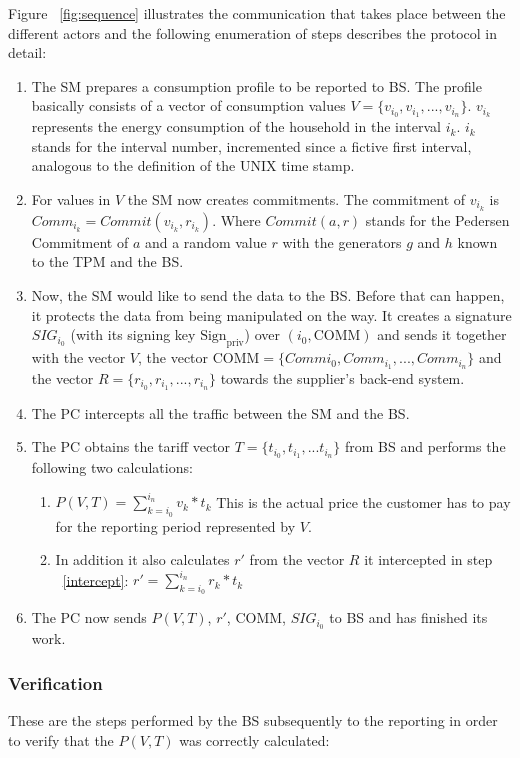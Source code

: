 \documentclass[english]{llncs}
\begin{document}
Figure ~\ref{fig:sequence} illustrates the communication that takes place between the different actors and the following enumeration of steps describes the protocol in detail:
\begin{enumerate}
\item The SM prepares a consumption profile to be reported to BS. The profile basically consists of a vector of consumption values  
$V=\{v_{i_0},v_{i_1},...,v_{i_n}\}$. $v_{i_k}$ represents the energy consumption of the household in the interval $i_k$. $i_k$ stands for the interval number, 
incremented since a fictive first interval, analogous to the definition of the UNIX time stamp. 
\item For values in $V$ the SM now creates commitments. The commitment of $v_{i_k}$ is $Comm_{i_k}=Commit(v_{i_k},r_{i_k}) $. Where $Commit(a,r)$ stands for the Pedersen Commitment  of $a$ and a random value $r$ with the generators $g$ and $h$ known to the TPM and the BS.
\item \label{sigi} Now, the SM would like to send the data to the BS. Before that can happen, it protects the data from being manipulated on the way. It creates a signature $SIG_{i_0}$ (with its signing key $\text{Sign}_\text{priv}$) over $(i_0,\text{COMM})$ and sends it together with the vector $V$, the vector $\text{COMM} = \{Comm{i_0},Comm_{i_1},...,Comm_{i_n}\}$ and the vector $R = \{r_{i_0},r_{i_1},...,r_{i_n}\}$ towards the supplier's back-end system.
\item \label{intercept} The PC intercepts all the traffic between the SM and the BS.
\item \label{tariff} The PC obtains the tariff vector $T=\{t_{i_0},t_{i_1},...t_{i_n}\}$ from BS and performs the following two calculations:
\begin{enumerate}
\item $P(V,T)=\sum_{k=i_0}^{i_n} v_k*t_k $  This is the actual price the customer has to pay 
for the reporting period represented by $V$. 
\item In addition it also calculates $r'$ from the vector $R$ it intercepted in step ~\ref{intercept}:
$r\prime=\sum_{k=i_0}^{i_n} r_k * t_k $ 
\end{enumerate}
\item \label{proof} The PC now sends $P(V,T)$, $r'$, $\text{COMM}$, $SIG_{i_0}$ to BS and has finished its work.
\end{enumerate}

\subsubsection{Verification}
\label{verification}
These are the steps  performed by the BS subsequently  to the reporting in order to verify that the $P(V,T)$ was correctly calculated:
\end{document}
